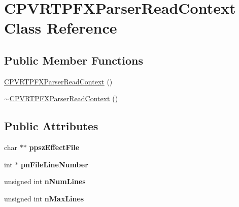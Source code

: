 \hypertarget{class_c_p_v_r_t_p_f_x_parser_read_context}{\section{C\+P\+V\+R\+T\+P\+F\+X\+Parser\+Read\+Context Class Reference}
\label{class_c_p_v_r_t_p_f_x_parser_read_context}
}
\subsection*{Public Member Functions}
\begin{DoxyCompactItemize}
\item 
\hyperlink{class_c_p_v_r_t_p_f_x_parser_read_context_a045f307cb03b743f7c923f2fad35944b}{C\+P\+V\+R\+T\+P\+F\+X\+Parser\+Read\+Context} ()
\item 
\hyperlink{class_c_p_v_r_t_p_f_x_parser_read_context_a5100ecec46e7763b3e257a0fa94f300e}{$\sim$\+C\+P\+V\+R\+T\+P\+F\+X\+Parser\+Read\+Context} ()
\end{DoxyCompactItemize}
\subsection*{Public Attributes}
\begin{DoxyCompactItemize}
\item 
\hypertarget{class_c_p_v_r_t_p_f_x_parser_read_context_ad9cff1cf79ff875c5489cc57521ec0eb}{char $\ast$$\ast$ {\bfseries ppsz\+Effect\+File}}\label{class_c_p_v_r_t_p_f_x_parser_read_context_ad9cff1cf79ff875c5489cc57521ec0eb}

\item 
\hypertarget{class_c_p_v_r_t_p_f_x_parser_read_context_aa4a8ab2212c032cd1782aa92f120d079}{int $\ast$ {\bfseries pn\+File\+Line\+Number}}\label{class_c_p_v_r_t_p_f_x_parser_read_context_aa4a8ab2212c032cd1782aa92f120d079}

\item 
\hypertarget{class_c_p_v_r_t_p_f_x_parser_read_context_ad83c6ed3f9ceb36b8891da4e36b6be71}{unsigned int {\bfseries n\+Num\+Lines}}\label{class_c_p_v_r_t_p_f_x_parser_read_context_ad83c6ed3f9ceb36b8891da4e36b6be71}

\item 
\hypertarget{class_c_p_v_r_t_p_f_x_parser_read_context_a45222195c5f29392d33968e25cb11837}{unsigned int {\bfseries n\+Max\+Lines}}\label{class_c_p_v_r_t_p_f_x_parser_read_context_a45222195c5f29392d33968e25cb11837}

\end{DoxyCompactItemize}


